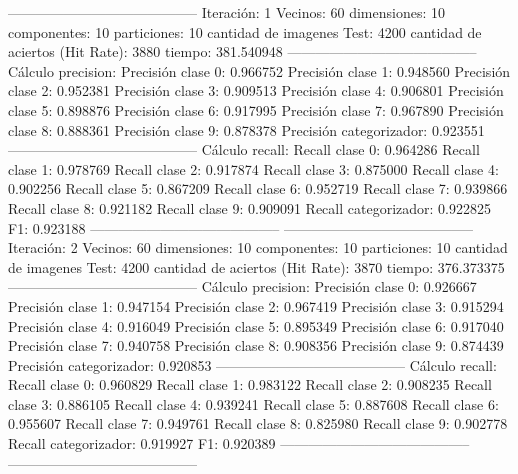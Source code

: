 -----------------------------------------
Iteración: 1
Vecinos: 60
dimensiones: 10
componentes: 10
particiones: 10
cantidad de imagenes Test: 4200
cantidad de aciertos (Hit Rate): 3880
tiempo: 381.540948
-----------------------------------------
Cálculo precision: 
Precisión clase 0: 0.966752
Precisión clase 1: 0.948560
Precisión clase 2: 0.952381
Precisión clase 3: 0.909513
Precisión clase 4: 0.906801
Precisión clase 5: 0.898876
Precisión clase 6: 0.917995
Precisión clase 7: 0.967890
Precisión clase 8: 0.888361
Precisión clase 9: 0.878378
Precisión categorizador: 0.923551
-----------------------------------------
Cálculo recall: 
Recall clase 0: 0.964286
Recall clase 1: 0.978769
Recall clase 2: 0.917874
Recall clase 3: 0.875000
Recall clase 4: 0.902256
Recall clase 5: 0.867209
Recall clase 6: 0.952719
Recall clase 7: 0.939866
Recall clase 8: 0.921182
Recall clase 9: 0.909091
Recall categorizador: 0.922825
F1: 0.923188
-----------------------------------------
-----------------------------------------
Iteración: 2
Vecinos: 60
dimensiones: 10
componentes: 10
particiones: 10
cantidad de imagenes Test: 4200
cantidad de aciertos (Hit Rate): 3870
tiempo: 376.373375
-----------------------------------------
Cálculo precision: 
Precisión clase 0: 0.926667
Precisión clase 1: 0.947154
Precisión clase 2: 0.967419
Precisión clase 3: 0.915294
Precisión clase 4: 0.916049
Precisión clase 5: 0.895349
Precisión clase 6: 0.917040
Precisión clase 7: 0.940758
Precisión clase 8: 0.908356
Precisión clase 9: 0.874439
Precisión categorizador: 0.920853
-----------------------------------------
Cálculo recall: 
Recall clase 0: 0.960829
Recall clase 1: 0.983122
Recall clase 2: 0.908235
Recall clase 3: 0.886105
Recall clase 4: 0.939241
Recall clase 5: 0.887608
Recall clase 6: 0.955607
Recall clase 7: 0.949761
Recall clase 8: 0.825980
Recall clase 9: 0.902778
Recall categorizador: 0.919927
F1: 0.920389
-----------------------------------------
-----------------------------------------
